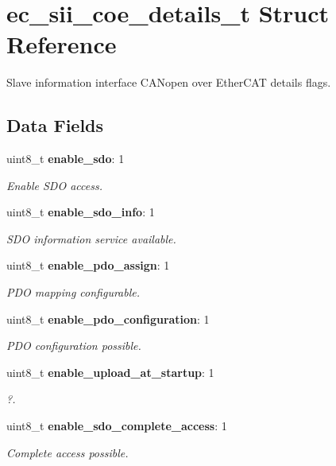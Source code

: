 \section{ec\-\_\-sii\-\_\-coe\-\_\-details\-\_\-t Struct Reference}
\label{structec__sii__coe__details__t}


Slave information interface C\-A\-Nopen over Ether\-C\-A\-T details flags.  


\subsection*{Data Fields}
\begin{DoxyCompactItemize}
\item 
uint8\-\_\-t {\bf enable\-\_\-sdo}\-: 1
\begin{DoxyCompactList}\small\item\em Enable S\-D\-O access. \end{DoxyCompactList}\item 
uint8\-\_\-t {\bf enable\-\_\-sdo\-\_\-info}\-: 1
\begin{DoxyCompactList}\small\item\em S\-D\-O information service available. \end{DoxyCompactList}\item 
uint8\-\_\-t {\bf enable\-\_\-pdo\-\_\-assign}\-: 1
\begin{DoxyCompactList}\small\item\em P\-D\-O mapping configurable. \end{DoxyCompactList}\item 
uint8\-\_\-t {\bf enable\-\_\-pdo\-\_\-configuration}\-: 1
\begin{DoxyCompactList}\small\item\em P\-D\-O configuration possible. \end{DoxyCompactList}\item 
uint8\-\_\-t {\bf enable\-\_\-upload\-\_\-at\-\_\-startup}\-: 1
\begin{DoxyCompactList}\small\item\em ?. \end{DoxyCompactList}\item 
uint8\-\_\-t {\bf enable\-\_\-sdo\-\_\-complete\-\_\-access}\-: 1
\begin{DoxyCompactList}\small\item\em Complete access possible. \end{DoxyCompactList}\end{DoxyCompactItemize}


